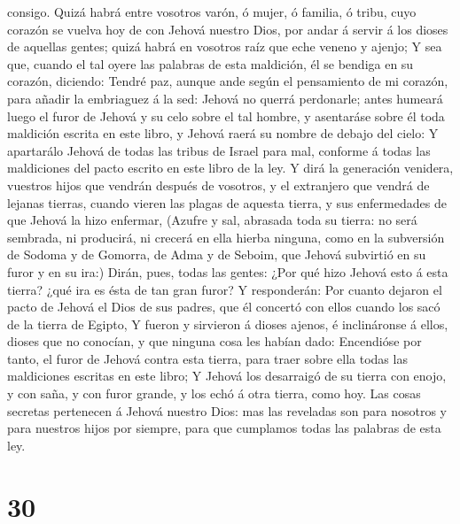 consigo.  Quizá habrá entre vosotros varón, ó mujer, ó
familia, ó tribu, cuyo corazón se vuelva hoy de con Jehová nuestro Dios,
por andar á servir á los dioses de aquellas gentes; quizá habrá en
vosotros raíz que eche veneno y ajenjo;  Y sea que,
cuando el tal oyere las palabras de esta maldición, él se bendiga en su
corazón, diciendo: Tendré paz, aunque ande según el pensamiento de mi
corazón, para añadir la embriaguez á la sed:  Jehová no
querrá perdonarle; antes humeará luego el furor de Jehová y su celo
sobre el tal hombre, y asentaráse sobre él toda maldición escrita en
este libro, y Jehová raerá su nombre de debajo del cielo:
 Y apartarálo Jehová de todas las tribus de Israel para
mal, conforme á todas las maldiciones del pacto escrito en este libro de
la ley.  Y dirá la generación venidera, vuestros hijos
que vendrán después de vosotros, y el extranjero que vendrá de lejanas
tierras, cuando vieren las plagas de aquesta tierra, y sus enfermedades
de que Jehová la hizo enfermar,  (Azufre y sal, abrasada
toda su tierra: no será sembrada, ni producirá, ni crecerá en ella
hierba ninguna, como en la subversión de Sodoma y de Gomorra, de Adma y
de Seboim, que Jehová subvirtió en su furor y en su ira:)
 Dirán, pues, todas las gentes: ¿Por qué hizo Jehová esto
á esta tierra? ¿qué ira es ésta de tan gran furor?  Y
responderán: Por cuanto dejaron el pacto de Jehová el Dios de sus
padres, que él concertó con ellos cuando los sacó de la tierra de
Egipto,  Y fueron y sirvieron á dioses ajenos, é
inclináronse á ellos, dioses que no conocían, y que ninguna cosa les
habían dado:  Encendióse por tanto, el furor de Jehová
contra esta tierra, para traer sobre ella todas las maldiciones escritas
en este libro;  Y Jehová los desarraigó de su tierra con
enojo, y con saña, y con furor grande, y los echó á otra tierra, como
hoy.  Las cosas secretas pertenecen á Jehová nuestro
Dios: mas las reveladas son para nosotros y para nuestros hijos por
siempre, para que cumplamos todas las palabras de esta ley.

\hypertarget{section-29}{%
\section{30}\label{section-29}}

